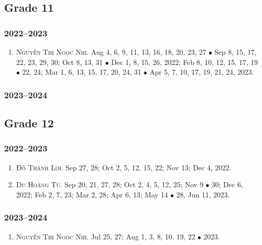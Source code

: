 \documentclass{article}
\begin{document}
\subsection{Grade 11}

\subsubsection{2022--2023}

\begin{enumerate}
	\item \textsc{Nguyễn Thị Ngọc Nhi.} {\sf[In]} Aug 4, 6, 9, 11, 13, 16, 18, 20, 23, 27 $\bullet$ Sep 8, 15, 17, 22, 23, 29, 30; Oct 8, 13, 31 $\bullet$ Dec 1, 8,  15, 26, 2022; Feb 8, 10, 12, 15, 17, 19 $\bullet$ 22, 24; Mar 1, 6, 13, 15, 17, 20, 24, 31 $\bullet$ Apr 5, 7, 10, 17, 19, 21, 24, 2023. {\sf[Out]}
\end{enumerate}

\subsubsection{2023--2024}


\subsection{Grade 12}

\subsubsection{2022--2023}

\begin{enumerate}
	\item \textsc{Đỗ Thành Lợi.} {\sf[In]} Sep 27, 28; Oct 2, 5, 12, 15, 22; Nov 13; Dec 4, 2022. {\sf[Out]}
	\item \textsc{Du Hoàng Tú.} {\sf[In]} Sep 20, 21, 27, 28; Oct 2, 4, 5, 12, 25; Nov 9 $\bullet$ 30; Dec 6, 2022; Feb 2, 7, 23; Mar 2, 28; Apr 6, 13; May 14 $\bullet$ 28, Jun 11, 2023. {\sf[Out]}
\end{enumerate}

\subsubsection{2023--2024}

\begin{enumerate}
	\item \textsc{Nguyễn Thị Ngọc Nhi.} {\sf[In]} Jul 25, 27; Aug 1, 3, 8, 10, 19, 22 $\bullet$ 2023. {\sf[Out]}
\end{enumerate}
\end{document}
